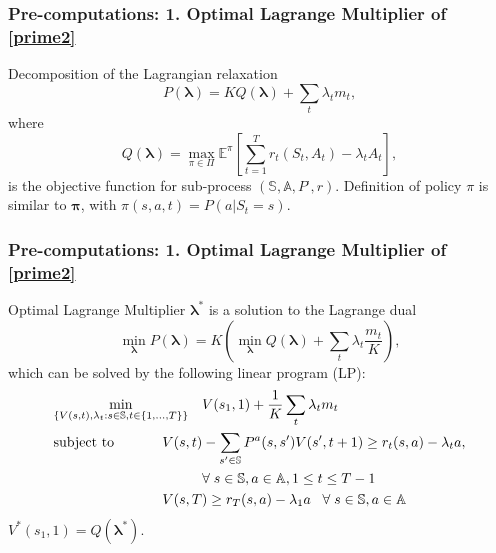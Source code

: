 \documentclass{beamer}
\newcommand{\lambdav}{\pmb{\lambda}}
\newcommand{\allp}{\pmb{\pi}}
\newcommand{\subp}{\pi}
\newcommand{\subpset}{\Pi}
\newcommand{\subr}{r}
\newcommand{\substates}{\mathbb{S}}
\newcommand{\substater}{S}
\newcommand{\substate}{s}
\newcommand{\subactions}{\mathbb{A}}
\newcommand{\subar}{A}
\newcommand{\subpr}{P}
\newcommand{\subaction}{a}
\begin{document}
\begin{frame}
\frametitle{Pre-computations: 1. Optimal Lagrange Multiplier of \eqref{prime2}}
Decomposition of the Lagrangian relaxation
\begin{equation}\label{dec}
P(\lambdav)=K Q(\lambdav) + \sum_t\lambda_t m_t,
\end{equation}
where
\begin{equation}\label{dpx}
Q(\lambdav)=\max_{\subp\in \subpset}\mathbb{E}^{\subp}\left[\sum_{t=1}^{T}\subr_t(\substater_t,\subar_t)-\lambda_t \subar_t\right],
\end{equation}
is the objective function for sub-process $(\substates,\subactions,\subpr^{\cdot},\subr)$. Definition of policy $\subp$ is similar to $\allp$, with  $\subp(\substate,\subaction,t) = P(\subaction|\substater_t=\substate)$.

\end{frame}

\begin{frame}
\frametitle{Pre-computations: 1. Optimal Lagrange Multiplier of \eqref{prime2}}
Optimal Lagrange Multiplier $\lambdav^*$ is a solution to the Lagrange dual
\begin{equation}\label{eq:dual}
\min_{\lambdav} P(\lambdav) = K\left(\min_{\lambdav}Q(\lambdav)+\sum_t\lambda_t\frac{m_t}{K}\right),
\end{equation}
which can be solved by the following linear program (LP):
\small
\begin{equation}\label{LP-p}
\begin{aligned}
& \underset{\{V(s,t),\lambda_t:s\in\substates,t\in\{1,...,T\}\}}{\text{min}}
& & V(s_1,1)+\frac{1}{K}\sum_t \lambda_t m_t \\
& \text{subject to}
& & \hspace{-1cm}V(s,t)-\sum_{s'\in\substates}P^a(s,s')V(s',t+1)\geq r_t(s,a)-\lambda_ta, \\
& & &\forall\; s\in\substates,a\in\subactions,1\leq t\leq T-1\\
& & &\hspace{-1cm} V(s,T)\geq r_T(s,a)-\lambda_1a\;\;\;\forall\;s\in\substates,a\in\subactions
\end{aligned}
\end{equation}
\normalsize
$V^*(s_1,1)=Q(\lambdav^*)$.
\end{frame}
\end{document}
